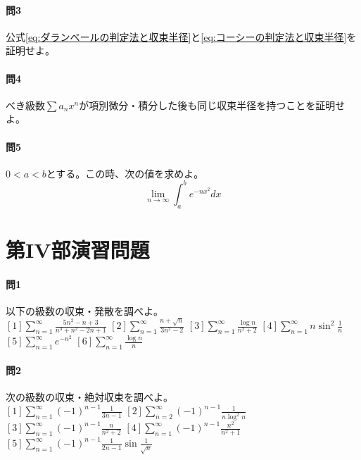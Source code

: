 \documentclass[a4j,dvipdfmx]{jsarticle}
\begin{document}
                \paragraph{問3}公式\eqref{eq:ダランベールの判定法と収束半径}と\eqref{eq:コーシーの判定法と収束半径}を証明せよ。

                \paragraph{問4}べき級数$\sum a_nx^n$が項別微分・積分した後も同じ収束半径を持つことを証明せよ。

                \paragraph{問5}$0<a<b$とする。この時、次の値を求めよ。
                    \begin{equation*}
                        \lim_{n\to\infty}\int_{a}^{b}e^{-nx^2}dx
                    \end{equation*}
        \clearpage
        \section{第IV部演習問題}
            \paragraph{問1}以下の級数の収束・発散を調べよ。\\
            $\displaystyle [1]\sum_{n=1}^{\infty}\frac{5n^2-n+3}{n^3+n^2-2n+1}$\hspace{3mm}
            $\displaystyle [2]\sum_{n=1}^{\infty}\frac{n+\sqrt{n}}{3n^2-2}$\hspace{3mm}
            $\displaystyle [3]\sum_{n=1}^{\infty}\frac{\log n}{n^2+2}$\hspace{3mm}
            $\displaystyle [4]\sum_{n=1}^{\infty}n\sin^2\frac{1}{n}$\hspace{3mm}
            $\displaystyle [5]\sum_{n=1}^{\infty}e^{-n^2}$\hspace{3mm}
            $\displaystyle [6]\sum_{n=1}^{\infty}\frac{\log n}{n}$

            \paragraph{問2}次の級数の収束・絶対収束を調べよ。\\
            $\displaystyle [1]\sum_{n=1}^{\infty}(-1)^{n-1}\frac{1}{3n-1}$\hspace{3mm}
            $\displaystyle [2]\sum_{n=2}^{\infty}(-1)^{n-1}\frac{1}{n\log^2 n}$\hspace{3mm}
            $\displaystyle [3]\sum_{n=1}^{\infty}(-1)^{n-1}\frac{n}{n^2+2}$\hspace{3mm}
            $\displaystyle [4]\sum_{n=1}^{\infty}(-1)^{n-1}\frac{n^2}{n^2+1}$\hspace{3mm}
            $\displaystyle [5]\sum_{n=1}^{\infty}(-1)^{n-1}\frac{1}{2n-1}\sin\frac{1}{\sqrt{n}}$\hspace{3mm}
\end{document}
